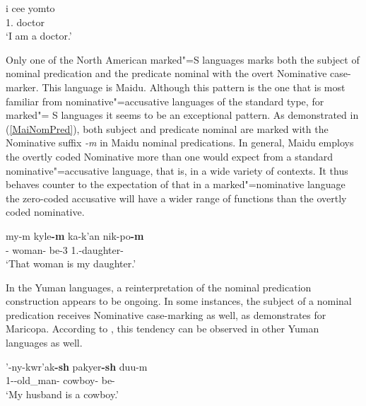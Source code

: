 
\begin{exe}\ex\label{WapPredNom}
\gll i ce{\textglotstop}e{\textglotstop} yomto\textglotstop\\
  1\sg{}.\acc{} \cop{} doctor\\
\glt `I am a doctor.'
\end{exe}

Only one of the North American marked"=S languages marks both the subject of nominal predication and the predicate nominal with the overt Nominative case-marker. 
This language is Maidu. Although this pattern is the one that is most familiar from nominative"=accusative languages of the standard type, for marked"= S languages it seems to be an exceptional pattern. 
As demonstrated in (\ref{MaiNomPred}), both subject and predicate nominal are marked with the Nominative suffix \emph{-m} in Maidu nominal predications.
In general, Maidu employs the overtly coded Nominative more than one would expect from a standard nominative"=accusative language, that is, in a wide variety of contexts. 
It thus behaves counter to the expectation of \citet{Koenig:2008} that in a marked"=nominative language the zero-coded accusative will have a wider range of functions than the overtly coded nominative. 


\begin{exe}\ex\label{MaiNomPred}
 \gll my-m kyle\textbf{-m} ka-k'an nik-po\textbf{-m}\\
\dem{}-\nom{} woman-\nom{} be-3 1\sg{}.\poss{}-daughter-\nom{}\\
\glt `That woman is my daughter.'
\end{exe}

In the Yuman languages, a reinterpretation of the nominal predication construction appears to be ongoing. 
In some instances, the subject of a nominal predication receives Nominative case-marking as well, as \citet[39--40]{Gordon:1986} demonstrates for Maricopa. 
According to \citet[469--471]{Munro:1977}, this tendency can be observed in other Yuman languages as well. 

\begin{exe}\ex{}
\gll '-ny-kwr'ak\textbf{-sh} pakyer\textbf{-sh} duu-m\\
1-\poss{}-old\_man-\nom{} cowboy-\nom{} be-\rls{}\\
\glt `My husband is a cowboy.'
\end{exe}

